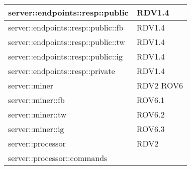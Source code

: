 \begin{center}
\begin{longtable}{| p{9cm} | p{4cm} |}
\hline
server::endpoints::resp::public  &  RDV1.4 \newline \\
\hline
server::endpoints::resp::public::fb  &  RDV1.4 \newline\\
\hline
server::endpoints::resp::public::tw  &  RDV1.4 \newline \\
\hline
server::endpoints::resp::public::ig  &  RDV1.4 \newline \\
\hline
server::endpoints::resp::private  &  RDV1.4 \newline \\
\hline
server::miner  & RDV2 \newline ROV6 \newline \\
\hline
server::miner::fb  &  ROV6.1 \newline \\
\hline
server::miner::tw  &  ROV6.2 \newline \\
\hline
server::miner::ig  &  ROV6.3 \newline \\
\hline
server::processor  & RDV2 \newline \\
\hline
server::processor::commands  & \newline \\
\hline

\end{longtable}
\end{center}
